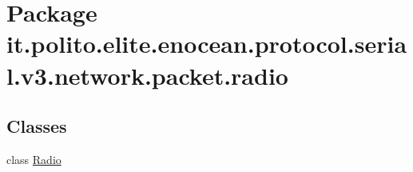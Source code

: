 \hypertarget{namespaceit_1_1polito_1_1elite_1_1enocean_1_1protocol_1_1serial_1_1v3_1_1network_1_1packet_1_1radio}{}\section{Package it.\+polito.\+elite.\+enocean.\+protocol.\+serial.\+v3.\+network.\+packet.\+radio}
\label{namespaceit_1_1polito_1_1elite_1_1enocean_1_1protocol_1_1serial_1_1v3_1_1network_1_1packet_1_1radio}
\subsection*{Classes}
\begin{DoxyCompactItemize}
\item 
class \hyperlink{classit_1_1polito_1_1elite_1_1enocean_1_1protocol_1_1serial_1_1v3_1_1network_1_1packet_1_1radio_1_1_radio}{Radio}
\end{DoxyCompactItemize}
